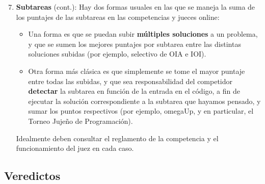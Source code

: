 \documentclass{beamer}
\begin{document}
    \begin{frame}[noframenumbering]
        \begin{enumerate}
            \setcounter{enumi}{6}
            \item \textbf{Subtareas} (cont.): Hay dos formas usuales en las que se maneja la suma de los puntajes de las subtareas en las competencias y jueces online: \pause
                \begin{itemize}
                    \setlength\itemsep{.15em}
                    \item Una forma es que se puedan subir \textbf{múltiples soluciones} a un problema, y que se sumen los mejores puntajes por subtarea entre las distintas soluciones subidas \pause (por ejemplo, selectivo de OIA e IOI). \pause
                    \item Otra forma más clásica es que simplemente se tome el mayor puntaje entre todas las subidas, y que sea responsabilidad del competidor \textbf{detectar} la subtarea en función de la entrada en el código, a fin de ejecutar la solución correspondiente a la subtarea que hayamos pensado, y sumar los puntos respectivos \pause (por ejemplo, omegaUp, y en particular, el Torneo Jujeño de Programación). \pause
                \end{itemize}
            Idealmente deben consultar el reglamento de la competencia y el funcionamiento del juez en cada caso.
        \end{enumerate}
    \end{frame}

    \subsection{Veredictos}
    \begin{frame}
    \end{frame}
\end{document}
